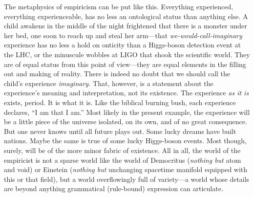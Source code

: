 \documentclass[aps,pra,superscriptaddress,12pt,tightenlines,nofootinbib]{revtex4-2}
\begin{document}
The metaphysics of empiricism can be put like this.  Every\-thing experienced, everything experienceable, has no less an ontological status than anything else.  A child awakens in the middle of the night frightened that there is a monster under her bed, one soon to reach up and steal her arm---that {\it we-would-call-imaginary\/} experience has no less a hold on onticity than a Higgs-boson detection event at the LHC, or the minuscule wobbles at LIGO that shook the scientific world.  They are of equal status from this point of view---they are equal elements in the filling out and making of reality.  There is indeed no doubt that we should call the child's experience {\it imaginary.}  That, however, is a statement about the experience's meaning and interpretation, not its existence.  The ex\-pe\-rience {\it as it is\/} exists, period. It is what it is.  Like the biblical burning bush, each ex\-pe\-rience declares, ``I am that I am.''  Most likely in the present example, the experience will be a little piece of the universe isolated, on its own, and of no great consequence.  But one never knows until all future plays out.  Some lucky dreams have built nations.
Maybe the same is true of some lucky Higgs-boson events.  Most though, surely, will be of the more minor fabric of existence.  All in all, the world of the empiricist is not a sparse world like the world of Democritus ({\it nothing but\/} atom and void) or Einstein ({\it nothing but\/} unchanging spacetime manifold equipped with this or that field), but a world overflowingly full of variety---a world whose details are beyond anything grammatical (rule-bound) expression can articulate.
\end{document}
